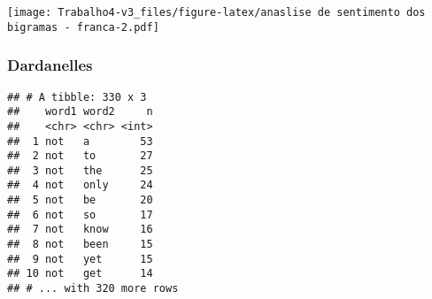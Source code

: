 \documentclass[]{article}
\newenvironment{Shaded}{\begin{snugshade}}{\end{snugshade}}
\newcommand{\DataTypeTok}[1]{\textcolor[rgb]{0.13,0.29,0.53}{#1}}
\newcommand{\KeywordTok}[1]{\textcolor[rgb]{0.13,0.29,0.53}{\textbf{#1}}}
\newcommand{\NormalTok}[1]{#1}
\newcommand{\OperatorTok}[1]{\textcolor[rgb]{0.81,0.36,0.00}{\textbf{#1}}}
\newcommand{\OtherTok}[1]{\textcolor[rgb]{0.56,0.35,0.01}{#1}}
\newcommand{\StringTok}[1]{\textcolor[rgb]{0.31,0.60,0.02}{#1}}
\begin{document}
\texttt{[image: Trabalho4-v3\_files/figure-latex/anaslise de sentimento dos bigramas - franca-2.pdf]}

\hypertarget{dardanelles-4}{%
\subsubsection{Dardanelles}\label{dardanelles-4}}

\begin{Shaded}
\end{Shaded}

\begin{verbatim}
## # A tibble: 330 x 3
##    word1 word2     n
##    <chr> <chr> <int>
##  1 not   a        53
##  2 not   to       27
##  3 not   the      25
##  4 not   only     24
##  5 not   be       20
##  6 not   so       17
##  7 not   know     16
##  8 not   been     15
##  9 not   yet      15
## 10 not   get      14
## # ... with 320 more rows
\end{verbatim}
\end{document}
